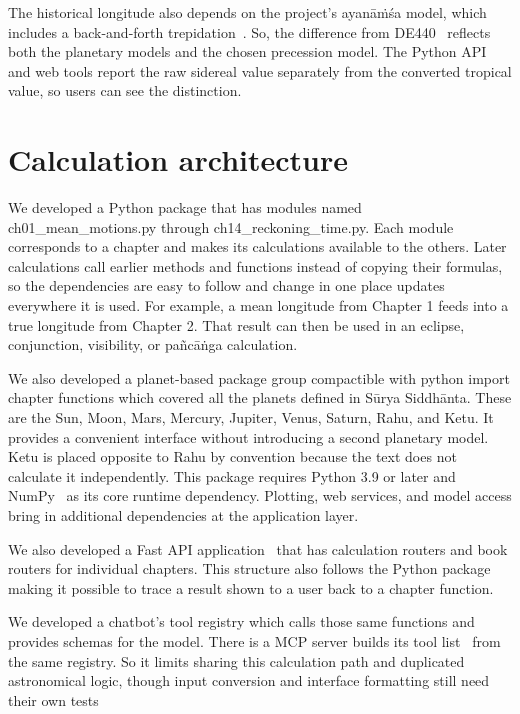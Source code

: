 \documentclass[12pt,a4paper,oneside]{report}
\newcommand{\surya}{Sūrya Siddhānta\xspace}
\begin{document}
The historical longitude also depends on the project's ayanāṁśa model, which includes a back-and-forth trepidation~\cite{burgess1860,pingree1978}. So, the difference from DE440~\cite{Park2021DE440} reflects both the planetary models and the chosen precession model. The Python API and web tools report the raw sidereal value separately from the converted tropical value, so users can see the distinction.

\section{Calculation architecture}
\label{sec:architecture}

We developed a Python package that has modules named ch01\_mean\_motions.py through ch14\_reckoning\_time.py. Each module corresponds to a chapter and makes its calculations available to the others. Later calculations call earlier methods and functions instead of copying their formulas, so the dependencies are easy to follow and change in one place updates everywhere it is used. For example, a mean longitude from Chapter 1 feeds into a true longitude from Chapter 2. That result can then be used in an eclipse, conjunction, visibility, or pañcāṅga calculation.

We also developed a planet-based package group compactible with python import chapter functions which covered all the planets defined in \surya. These are the Sun, Moon, Mars, Mercury, Jupiter, Venus, Saturn, Rahu, and Ketu. It provides a convenient interface without introducing a second planetary model. Ketu is placed opposite to Rahu by convention because the text does not calculate it independently. This package requires Python 3.9 or later and NumPy~\cite{python,harris2020} as its core runtime dependency. Plotting, web services, and model access bring in additional dependencies at the application layer.

We also developed a Fast API application~\cite{fastapi} that has calculation routers and book routers for individual chapters. This structure also follows the Python package making it possible to trace a result shown to a user back to a chapter function.

We developed a chatbot's tool registry which calls those same functions and provides schemas for the model. There is a MCP server builds its tool list~\cite{mcp} from the same registry. So it limits sharing this calculation path and duplicated astronomical logic, though input conversion and interface formatting still need their own tests
\end{document}
